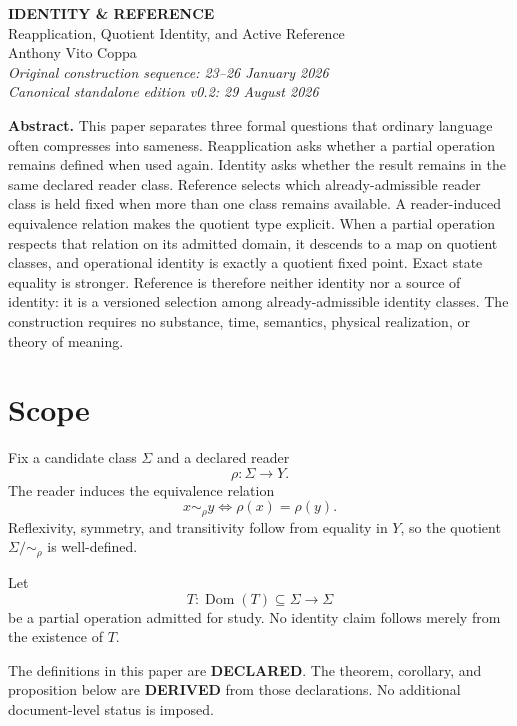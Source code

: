 \documentclass[11pt]{article}
\newcommand{\Dom}{\operatorname{Dom}}
\begin{document}
\begin{center}
{\Large\bfseries IDENTITY \& REFERENCE}\\[3pt]
{\large Reapplication, Quotient Identity, and Active Reference}\\[8pt]
Anthony Vito Coppa\\[2pt]
\textit{Original construction sequence: 23--26 January 2026}\\
\textit{Canonical standalone edition v0.2: 29 August 2026}
\end{center}

\begin{lawbox}
\textbf{Abstract.}
This paper separates three formal questions that ordinary language often compresses into sameness. Reapplication asks whether a partial operation remains defined when used again. Identity asks whether the result remains in the same declared reader class. Reference selects which already-admissible reader class is held fixed when more than one class remains available. A reader-induced equivalence relation makes the quotient type explicit. When a partial operation respects that relation on its admitted domain, it descends to a map on quotient classes, and operational identity is exactly a quotient fixed point. Exact state equality is stronger. Reference is therefore neither identity nor a source of identity: it is a versioned selection among already-admissible identity classes. The construction requires no substance, time, semantics, physical realization, or theory of meaning.
\end{lawbox}

\section{Scope}

Fix a candidate class $\Sigma$ and a declared reader
\[
\rho:\Sigma\to Y.
\]
The reader induces the equivalence relation
\[
\boxed{x\sim_\rho y\iff \rho(x)=\rho(y).}
\]
Reflexivity, symmetry, and transitivity follow from equality in $Y$, so the quotient $\Sigma/{\sim_\rho}$ is well-defined.

Let
\[
T:\Dom(T)\subseteq\Sigma\longrightarrow\Sigma
\]
be a partial operation admitted for study. No identity claim follows merely from the existence of $T$.

The definitions in this paper are \textbf{DECLARED}. The theorem, corollary, and proposition below are \textbf{DERIVED} from those declarations. No additional document-level status is imposed.
\end{document}
